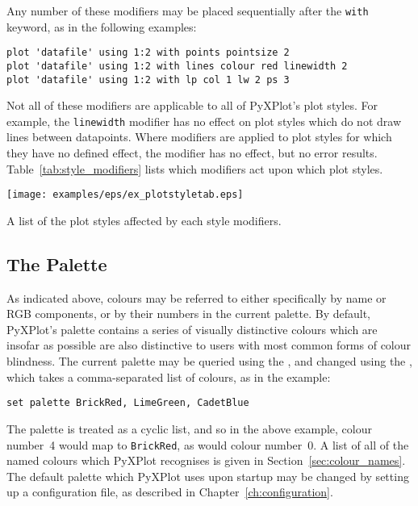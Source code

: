 Any number of these modifiers may be placed sequentially after the {\tt with}
keyword, as in the following examples:

\begin{verbatim}
plot 'datafile' using 1:2 with points pointsize 2
plot 'datafile' using 1:2 with lines colour red linewidth 2
plot 'datafile' using 1:2 with lp col 1 lw 2 ps 3
\end{verbatim}

\noindent Not all of these modifiers are applicable to all of PyXPlot's plot
styles. For example, the {\tt line\-width} modifier has no effect on plot
styles which do not draw lines between datapoints. Where modifiers are applied
to plot styles for which they have no defined effect, the modifier has no
effect, but no error results.  Table~\ref{tab:style_modifiers} lists which
modifiers act upon which plot styles.

\begin{table}
\centerline{\texttt{[image: examples/eps/ex\_plotstyletab.eps]}}
\caption{A list of the plot styles affected by each style modifiers.}
\label{tab:style_modifiers}
\end{table}

\subsection{The Palette}
\label{sec:palette}

 As indicated above, colours
may be referred to either specifically by name or RGB components, or by their
numbers in the current palette. By default, PyXPlot's palette contains a series
of visually distinctive colours which are insofar as possible are also
distinctive to users with most common forms of colour blindness. The current
palette may be queried using the , and changed using the
, which takes a comma-separated list of colours, as in the
example:

\begin{verbatim}
set palette BrickRed, LimeGreen, CadetBlue
\end{verbatim}

\noindent The palette is treated as a cyclic list, and so in the above example,
colour number~4 would map to {\tt BrickRed}, as would colour number~0. A list
of all of the named colours which PyXPlot recognises is given in
Section~\ref{sec:colour_names}. The default palette which PyXPlot uses upon
startup may be changed by setting up a configuration file, as described in
Chapter~\ref{ch:configuration}.

